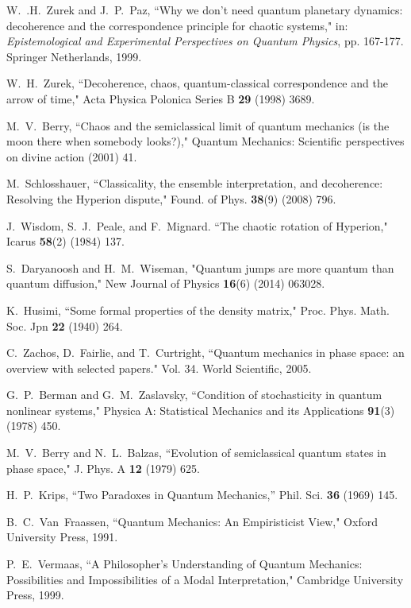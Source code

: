 \documentclass[12pt]{article}
\theoremstyle{plain}
\theoremstyle{definition}
\theoremstyle{remark}
\begin{document}
\begin{thebibliography}{99}
W.~.H.~Zurek and J.~P.~Paz, ``Why we don't need quantum planetary dynamics: decoherence and the correspondence principle for chaotic systems," in: {\it Epistemological and Experimental Perspectives on Quantum Physics\/}, pp. 167-177. Springer Netherlands, 1999.

W.~H.~Zurek, ``Decoherence, chaos, quantum-classical correspondence and the arrow of time,"   Acta Physica Polonica Series B {\bf29} (1998) 3689. 
 
M.~V.~Berry, ``Chaos and the semiclassical limit of quantum mechanics (is the moon there when somebody looks?),"   Quantum Mechanics: Scientific perspectives on divine action (2001) 41.

M.~Schlosshauer, ``Classicality, the ensemble interpretation, and decoherence: Resolving the Hyperion dispute,"   Found. of Phys. {\bf38}(9) (2008) 796.

J.~Wisdom, S.~J.~Peale, and F.~Mignard. ``The chaotic rotation of Hyperion,"   Icarus {\bf 58}(2) (1984) 137. 

S.~Daryanoosh and H.~M.~Wiseman, "Quantum jumps are more quantum than quantum diffusion,"   New Journal of Physics {\bf16}(6) (2014) 063028. 

K.~Husimi, ``Some formal properties of the density matrix,"   Proc. Phys. Math. Soc. Jpn {\bf 22} (1940) 264.

C.~Zachos, D.~Fairlie, and T.~Curtright, ``Quantum mechanics in phase space: an overview with selected papers." Vol. 34. World Scientific, 2005.

G.~P.~Berman and G.~M.~Zaslavsky, ``Condition of stochasticity in quantum nonlinear systems,"   Physica A: Statistical Mechanics and its Applications {\bf91}(3) (1978) 450.

M.~V.~Berry and N.~L.~Balzas,  ``Evolution of semiclassical quantum states in phase space,"   J. Phys. A {\bf12} (1979) 625.

H.~P.~Krips, ``Two Paradoxes in Quantum Mechanics,''
   Phil. Sci. {\bf36} (1969) 145.

B.~C.~Van~Fraassen,
   ``Quantum Mechanics: An Empiristicist View,"
   Oxford University Press, 1991.

P.~E.~Vermaas,
   ``A Philosopher's Understanding of Quantum Mechanics:
  Possibilities and Impossibilities of a Modal Interpretation,"
   Cambridge University Press, 1999.




\end{thebibliography}
\end{document}
